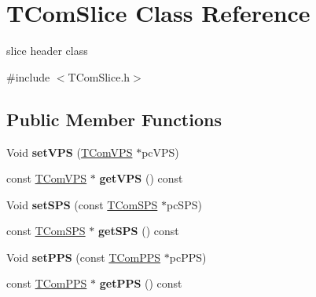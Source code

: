 \hypertarget{class_t_com_slice}{}\section{T\+Com\+Slice Class Reference}
\label{class_t_com_slice}


slice header class  




{\ttfamily \#include $<$T\+Com\+Slice.\+h$>$}

\subsection*{Public Member Functions}
\begin{DoxyCompactItemize}
\item 
\mbox{\label{class_t_com_slice_a8ea6d9be2f99a1b6b20879cc84055511}} 
Void {\bfseries set\+V\+PS} (\hyperlink{class_t_com_v_p_s}{T\+Com\+V\+PS} $\ast$pc\+V\+PS)
\item 
\mbox{\label{class_t_com_slice_aba32af9cc713c58a58bc856a9304a5cc}} 
const \hyperlink{class_t_com_v_p_s}{T\+Com\+V\+PS} $\ast$ {\bfseries get\+V\+PS} () const
\item 
\mbox{\label{class_t_com_slice_a36867df6220afaf9f9cbc7cf01ba6b93}} 
Void {\bfseries set\+S\+PS} (const \hyperlink{class_t_com_s_p_s}{T\+Com\+S\+PS} $\ast$pc\+S\+PS)
\item 
\mbox{\label{class_t_com_slice_a36726cfc7fe25350e834289a0f10473d}} 
const \hyperlink{class_t_com_s_p_s}{T\+Com\+S\+PS} $\ast$ {\bfseries get\+S\+PS} () const
\item 
\mbox{\label{class_t_com_slice_a6997c5aa335cc19a79c6916766acbbaa}} 
Void {\bfseries set\+P\+PS} (const \hyperlink{class_t_com_p_p_s}{T\+Com\+P\+PS} $\ast$pc\+P\+PS)
\item 
\mbox{\label{class_t_com_slice_aeb0753f729b40069799737f26f0d5190}} 
const \hyperlink{class_t_com_p_p_s}{T\+Com\+P\+PS} $\ast$ {\bfseries get\+P\+PS} () const
\item 
\mbox{\label{class_t_com_slice_ae138903baae525372622a6b345885ffe}} 

\end{DoxyCompactItemize}
